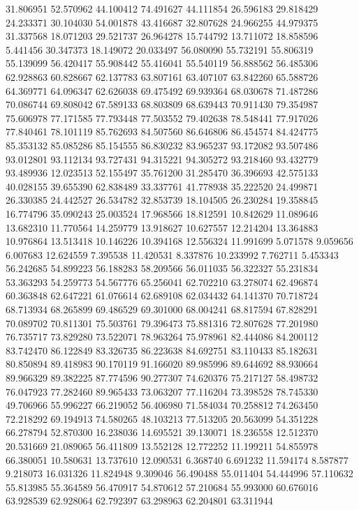 31.806951
52.570962
44.100412
74.491627
44.111854
26.596183
29.818429
24.233371
30.104030
54.001878
43.416687
32.807628
24.966255
44.979375
31.337568
18.071203
29.521737
26.964278
15.744792
13.711072
18.858596
5.441456
30.347373
18.149072
20.033497
56.080090
55.732191
55.806319
55.139099
56.420417
55.908442
55.416041
55.540119
56.888562
56.485306
62.928863
60.828667
62.137783
63.807161
63.407107
63.842260
65.588726
64.369771
64.096347
62.626038
69.475492
69.939364
68.030678
71.487286
70.086744
69.808042
67.589133
68.803809
68.639443
70.911430
79.354987
75.606978
77.171585
77.793448
77.503552
79.402638
78.548441
77.917026
77.840461
78.101119
85.762693
84.507560
86.646806
86.454574
84.424775
85.353132
85.085286
85.154555
86.830232
83.965237
93.172082
93.507486
93.012801
93.112134
93.727431
94.315221
94.305272
93.218460
93.432779
93.489936
12.023513
52.155497
35.761200
31.285470
36.396693
42.575133
40.028155
39.655390
62.838489
33.337761
41.778938
35.222520
24.499871
26.330385
24.442527
26.534782
32.853739
18.104505
26.230284
19.358845
16.774796
35.090243
25.003524
17.968566
18.812591
10.842629
11.089646
13.682310
11.770564
14.259779
13.918627
10.627557
12.214204
13.364883
10.976864
13.513418
10.146226
10.394168
12.556324
11.991699
5.071578
9.059656
6.007683
12.624559
7.395538
11.420531
8.337876
10.233992
7.762711
5.453343
56.242685
54.899223
56.188283
58.209566
56.011035
56.322327
55.231834
53.363293
54.259773
54.567776
65.256041
62.702210
63.278074
62.496874
60.363848
62.647221
61.076614
62.689108
62.034432
64.141370
70.718724
68.713934
68.265899
69.486529
69.301000
68.004241
68.817594
67.828291
70.089702
70.811301
75.503761
79.396473
75.881316
72.807628
77.201980
76.735717
73.829280
73.522071
78.963264
75.978961
82.444086
84.200112
83.742470
86.122849
83.326735
86.223638
84.692751
83.110433
85.182631
80.850894
89.418983
90.170119
91.166020
89.985996
89.644692
88.930664
89.966329
89.382225
87.774596
90.277307
74.620376
75.217127
58.498732
76.047923
77.282460
89.965433
73.063207
77.116204
73.398528
78.745330
49.706966
55.996227
66.219052
56.406980
71.584034
70.258812
74.263450
72.218292
69.194913
74.580265
48.103213
77.513205
20.563099
54.351228
66.278794
52.870300
16.238036
14.695521
39.130071
18.236558
12.512370
20.531669
21.089065
56.411809
13.552128
12.772252
11.199211
54.855978
66.380051
10.580631
13.737610
12.090531
6.368740
6.691232
11.594174
8.587877
9.218073
16.031326
11.824948
9.309046
56.490488
55.011404
54.444996
57.110632
55.813985
55.364589
56.470917
54.870612
57.210684
55.993000
60.676016
63.928539
62.928064
62.792397
63.298963
62.204801
63.311944
